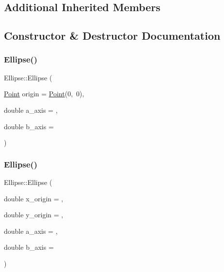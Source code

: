 \subsection*{Additional Inherited Members}


\subsection{Constructor \& Destructor Documentation}
\mbox{\label{class_ellipse_a8b1d116bc30be65369b4db5b9b1c5f9d}} 
\subsubsection{\texorpdfstring{Ellipse()}{Ellipse()}\hspace{0.1cm}{\footnotesize\ttfamily [1/2]}}
{\footnotesize\ttfamily Ellipse\+::\+Ellipse (\begin{DoxyParamCaption}\item[{\hyperlink{class_point}{Point}}]{origin = {\ttfamily \hyperlink{class_point}{Point}(0,~0)},  }\item[{double}]{a\+\_\+axis = {},  }\item[{double}]{b\+\_\+axis = {} }\end{DoxyParamCaption})\hspace{0.3cm}{\ttfamily [inline]}}

\mbox{\label{class_ellipse_a10da17fc6ffc0ea3590da040b42960e4}} 
\subsubsection{\texorpdfstring{Ellipse()}{Ellipse()}\hspace{0.1cm}{\footnotesize\ttfamily [2/2]}}
{\footnotesize\ttfamily Ellipse\+::\+Ellipse (\begin{DoxyParamCaption}\item[{double}]{x\+\_\+origin = {},  }\item[{double}]{y\+\_\+origin = {},  }\item[{double}]{a\+\_\+axis = {},  }\item[{double}]{b\+\_\+axis = {} }\end{DoxyParamCaption})\hspace{0.3cm}{\ttfamily [inline]}}

